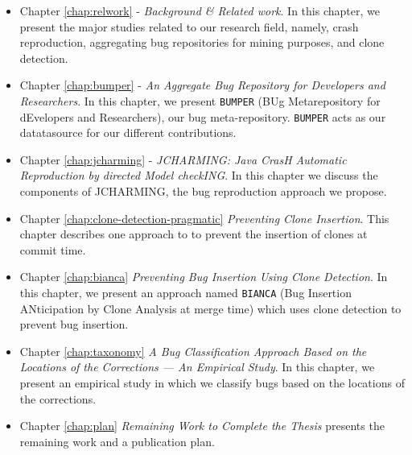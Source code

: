 \begin{itemize}
	\item Chapter \ref{chap:relwork} - {\it Background \& Related work}.
	In this chapter, we present the major studies related to our research field, namely, crash reproduction, aggregating bug repositories for mining purposes, and clone detection.
	\item Chapter \ref{chap:bumper} - {\it An Aggregate Bug Repository for Developers and Researchers}.
	In this chapter, we present {\tt BUMPER} (BUg Metarepository for  dEvelopers  and  Researchers), our bug meta-repository. {\tt BUMPER} acts as our datatasource for our different contributions.

	\item Chapter \ref{chap:jcharming} - {\it JCHARMING: Java CrasH Automatic Reproduction by directed Model checkING}.
	In this chapter we discuss the components of JCHARMING, the bug reproduction approach we propose.

	\item Chapter \ref{chap:clone-detection-pragmatic} {\it Preventing Clone Insertion}. This chapter describes one approach to  to prevent the insertion of clones at commit time.

	\item Chapter \ref{chap:bianca} {\it Preventing Bug Insertion Using Clone Detection}. In this chapter, we present an approach named {\tt BIANCA} (Bug Insertion ANticipation by Clone Analysis at merge time) which uses clone detection to prevent bug insertion.

	\item Chapter \ref{chap:taxonomy} {\it A Bug Classification Approach Based on the Locations of the Corrections --- An Empirical Study}.
	In this chapter, we present an empirical study in which we classify bugs based on the locations of the corrections.

	\item Chapter \ref{chap:plan} {\it Remaining Work to Complete the Thesis} presents  the remaining work and a publication plan.
\end{itemize}
